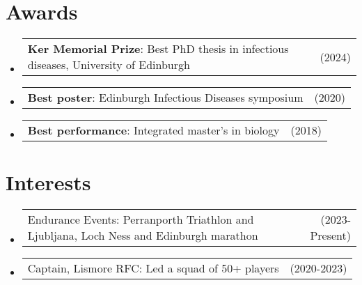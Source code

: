 \documentclass[a4paper,11pt]{article}
\begin{document}
\section{Awards}
\begin{itemize}[leftmargin=1.2em, itemsep=3pt, label=-]
\item \begin{tabularx}{\linewidth}{@{}X r@{}}
\textbf{Ker Memorial Prize}: Best PhD thesis in infectious diseases, University of Edinburgh & (2024) \\
\end{tabularx}
\item \begin{tabularx}{\linewidth}{@{}X r@{}}
\textbf{Best poster}: Edinburgh Infectious Diseases symposium & (2020) \\
\end{tabularx}
\item \begin{tabularx}{\linewidth}{@{}X r@{}}
\textbf{Best performance}: Integrated master's in biology & (2018) \\
\end{tabularx}
\end{itemize}

\section{Interests}
\begin{itemize}[leftmargin=1.2em, itemsep=3pt, label=-]
\item \begin{tabularx}{\linewidth}{@{}X r@{}}
Endurance Events: Perranporth Triathlon and Ljubljana, Loch Ness and Edinburgh marathon & (2023-Present) \\
\end{tabularx}
\item \begin{tabularx}{\linewidth}{@{}X r@{}}
Captain, Lismore RFC: Led a squad of 50+ players & (2020-2023) \\
\end{tabularx}
\end{itemize}
\end{document}
